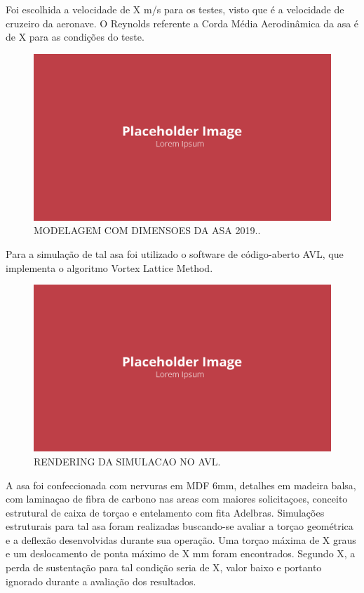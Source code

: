 Foi escolhida a velocidade de X m/s para os testes, visto que é a velocidade de cruzeiro da aeronave. O Reynolds referente a Corda Média Aerodinâmica da asa é de X para as condições do teste.

\begin{figure}[!ht]
    \centering
    \includegraphics[width=.8\linewidth]{figuras/outras/placeholder.png}
    \caption{MODELAGEM COM DIMENSOES DA ASA 2019.\cite{autor}.}
    \label{fig:placeholder}
\end{figure}

Para a simulação de tal asa foi utilizado o software de código-aberto AVL, que implementa o algoritmo Vortex Lattice Method.

\begin{figure}[!ht]
    \centering
    \includegraphics[width=.8\linewidth]{figuras/outras/placeholder.png}
    \caption{RENDERING DA SIMULACAO NO AVL\cite{autor}.}
    \label{fig:placeholder}
\end{figure}

A asa foi confeccionada com nervuras em MDF 6mm, detalhes em madeira balsa, com laminaçao de fibra de carbono nas areas com maiores solicitaçoes, conceito estrutural de caixa de torçao e entelamento com fita Adelbras. Simulações estruturais para tal asa foram realizadas buscando-se avaliar a torçao geométrica e a deflexão desenvolvidas durante sua operação. Uma torçao máxima de X graus e um deslocamento de ponta máximo de X mm foram encontrados. Segundo X, a perda de sustentação para tal condição seria de X, valor baixo e portanto ignorado durante a avaliação dos resultados.

